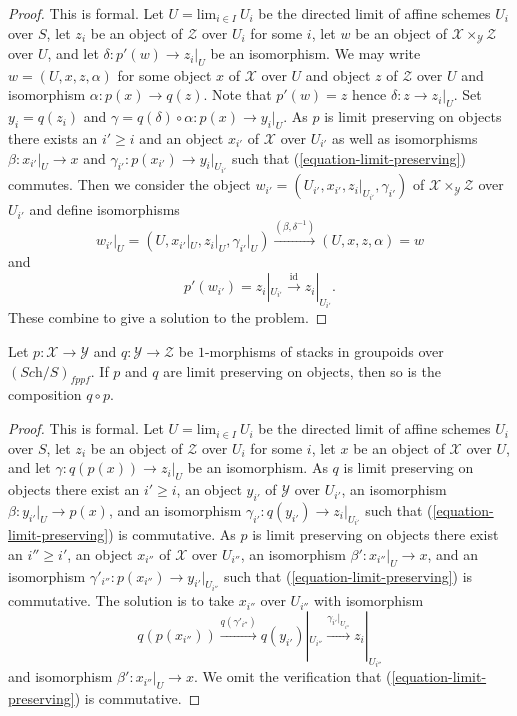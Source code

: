\begin{proof}
This is formal. Let $U = \text{lim}_{i \in I}\ U_i$ be the directed limit
of affine schemes $U_i$ over $S$, let $z_i$ be an object of $\mathcal{Z}$
over $U_i$ for some $i$, let $w$ be an object of
$\mathcal{X} \times_{\mathcal{Y}} \mathcal{Z}$ over $U$, and let
$\delta : p'(w) \to z_i|_U$ be an isomorphism. 
We may write
$w = (U, x, z, \alpha)$ for some object $x$ of $\mathcal{X}$ over $U$
and object $z$ of $\mathcal{Z}$ over $U$ and isomorphism
$\alpha : p(x) \to q(z)$. Note that $p'(w) = z$ hence
$\delta : z \to z_i|_U$. Set $y_i = q(z_i)$ and
$\gamma = q(\delta) \circ \alpha : p(x) \to y_i|_U$.
As $p$ is limit preserving on objects there exists an $i' \geq i$
and an object $x_{i'}$ of $\mathcal{X}$ over $U_{i'}$ as well as
isomorphisms $\beta : x_{i'}|_U \to x$ and
$\gamma_{i'} : p(x_{i'}) \to y_i|_{U_{i'}}$ such that
(\ref{equation-limit-preserving}) commutes. Then we consider the object
$w_{i'} = (U_{i'}, x_{i'}, z_i|_{U_{i'}}, \gamma_{i'})$ of
$\mathcal{X} \times_{\mathcal{Y}} \mathcal{Z}$ over $U_{i'}$
and define isomorphisms
$$
w_{i'}|_U = (U, x_{i'}|_U, z_i|_U, \gamma_{i'}|_U)
\xrightarrow{(\beta, \delta^{-1})}
(U, x, z, \alpha) = w
$$
and
$$
p'(w_{i'}) = z_i|_{U_{i'}} \xrightarrow{\text{id}} z_i|_{U_{i'}}.
$$
These combine to give a solution to the problem.
\end{proof}

\begin{lemma}
\label{lemma-composition-limit-preserving}
Let $p : \mathcal{X} \to \mathcal{Y}$ and $q : \mathcal{Y} \to \mathcal{Z}$
be $1$-morphisms of stacks in groupoids over $(\textit{Sch}/S)_{fppf}$.
If $p$ and $q$ are limit preserving on objects, then so is the composition
$q \circ p$.
\end{lemma}

\begin{proof}
This is formal. Let $U = \text{lim}_{i \in I}\ U_i$ be the directed limit
of affine schemes $U_i$ over $S$, let $z_i$ be an object of $\mathcal{Z}$
over $U_i$ for some $i$, let $x$ be an object of $\mathcal{X}$ over $U$,
and let $\gamma : q(p(x)) \to z_i|_U$ be an isomorphism. As $q$ is
limit preserving on objects there exist an $i' \geq i$, an object
$y_{i'}$ of $\mathcal{Y}$ over $U_{i'}$, an isomorphism
$\beta : y_{i'}|_U \to p(x)$, and an isomorphism
$\gamma_{i'} : q(y_{i'}) \to z_i|_{U_{i'}}$
such that (\ref{equation-limit-preserving}) is commutative. As $p$ is
limit preserving on objects there exist an $i'' \geq i'$, an object
$x_{i''}$ of $\mathcal{X}$ over $U_{i''}$, an isomorphism
$\beta' : x_{i''}|_U \to x$, and an isomorphism
$\gamma'_{i''} : p(x_{i''}) \to y_{i'}|_{U_{i''}}$
such that (\ref{equation-limit-preserving}) is commutative.
The solution is to take $x_{i''}$ over $U_{i''}$ with isomorphism
$$
q(p(x_{i''})) \xrightarrow{q(\gamma'_{i''})}
q(y_{i'})|_{U_{i''}} \xrightarrow{\gamma_{i'}|_{U_{i''}}}
z_i|_{U_{i''}}
$$
and isomorphism $\beta' : x_{i''}|_U \to x$. We omit the verification
that (\ref{equation-limit-preserving}) is commutative.
\end{proof}

